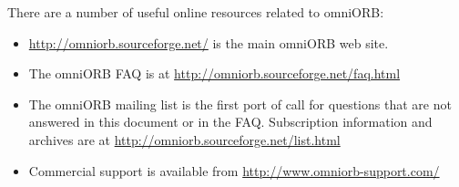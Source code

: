 \documentclass[11pt,oneside,a4paper]{book}
\begin{document}
There are a number of useful online resources related to omniORB:

\begin{itemize}

\item \url{http://omniorb.sourceforge.net/} is the main omniORB web
  site.

\item The omniORB FAQ is at \url{http://omniorb.sourceforge.net/faq.html}

\item The omniORB mailing list is the first port of call for questions
  that are not answered in this document or in the FAQ. Subscription
  information and archives are at
  \url{http://omniorb.sourceforge.net/list.html}

\item Commercial support is available from
  \url{http://www.omniorb-support.com/}

\end{itemize}



\backmatter


\end{document}
